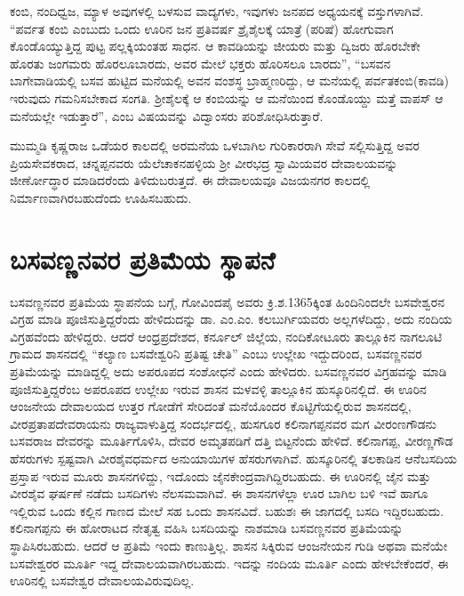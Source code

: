 ಕಂಬಿ, ನಂದಿಧ್ವಜ, ಮ್ಯಾಳ ಅವುಗಳಲ್ಲಿ ಬಳಸುವ ವಾದ್ಯಗಳು, ಇವುಗಳು ಜನಪದ ಅಧ್ಯಯನಕ್ಕೆ ವಸ್ತುಗಳಾಗಿವೆ. “ಪರ್ವತ ಕಂಬಿ ಎಂಬುದು ಒಂದು ಊರಿನ ಜನ ಪ್ರತಿವರ್ಷ ಶ್ರೈಶೈಲಕ್ಕೆ ಯಾತ್ರೆ (ಪರಿಷೆ) ಹೋಗುವಾಗ ಕೊಂಡೊಯ್ಯುತ್ತಿದ್ದ ಪುಟ್ಟ ಪಲ್ಲಕ್ಕಿಯಂತಹ ಸಾಧನ. ಆ ಕಾವಡಿಯನ್ನು ಜೀಯರು ಮತ್ತು ದ್ವಿಜರು ಹೊರಬೇಕೇ ಹೊರತು ಜಂಗಮರು ಹೊರಲೂಬಾರದು, ಅವರ ಮೇಲೆ ಭಕ್ತರು ಹೊರಿಸಲೂ ಬಾರದು”, “ಬಸವನ ಬಾಗೇವಾಡಿಯಲ್ಲಿ ಬಸವ ಹುಟ್ಟಿದ ಮನೆಯಲ್ಲಿ ಅವನ ವಂಶಸ್ಥ ಬ್ರಾಹ್ಮಣರಿದ್ದು, ಆ ಮನೆಯಲ್ಲಿ ಪರ್ವತಕಂಬಿ(ಕಾವಡಿ) ಇರುವುದು ಗಮನಿಸಬೇಕಾದ ಸಂಗತಿ. ಶ‍್ರೀಶೈಲಕ್ಕೆ ಆ ಕಂಬಿಯನ್ನು ಆ ಮನೆಯಿಂದ ಕೊಂಡೊಯ್ದು ಮತ್ತೆ ವಾಪಸ್​ ಆ ಮನೆಯಲ್ಲೇ ಇಡುತ್ತಾರೆ”, ಎಂಬ ವಿಷಯವನ್ನು ವಿದ್ವಾಂಸರು ಪರಿಶೋಧಿಸಿರುತ್ತಾರೆ.

ಮುಮ್ಮಡಿ ಕೃಷ್ಣರಾಜ ಒಡೆಯರ ಕಾಲದಲ್ಲಿ ಅರಮನೆಯ ಒಳಬಾಗಿಲ ಗುರಿಕಾರರಾಗಿ ಸೇವೆ ಸಲ್ಲಿಸುತ್ತಿದ್ದ ಅವರ ಪ್ರಿಯಸೇವಕರಾದ, ಚನ್ನಪ್ಪನವರು ಯೆಲೆಚಾಕನಹಳ್ಳಿಯ ಶ‍್ರೀ ವೀರಭದ್ರ ಸ್ವಾಮಿಯವರ ದೇವಾಲಯವನ್ನು ಜೀರ್ಣೋದ್ಧಾರ ಮಾಡಿದರೆಂದು ತಿಳಿದುಬರುತ್ತದೆ. ಈ ದೇವಾಲಯವೂ ವಿಜಯನಗರ ಕಾಲದಲ್ಲಿ ನಿರ್ಮಾಣವಾಗಿರಬಹುದೆಂದು ಊಹಿಸ\-ಬಹುದು.


\section*{ಬಸವಣ್ಣನವರ ಪ್ರತಿಮೆಯ ಸ್ಥಾಪನೆ}

ಬಸವಣ್ಣನವರ ಪ್ರತಿಮೆಯ ಸ್ಥಾಪನೆಯ ಬಗ್ಗೆ, ಗೋವಿಂದಪೈ ಅವರು ಕ್ರಿ.ಶ.1365ಕ್ಕಿಂತ ಹಿಂದಿನಿಂದಲೇ ಬಸವೇಶ್ವರನ ವಿಗ್ರಹ ಮಾಡಿ ಪೂಜಿಸುತ್ತಿದ್ದರೆಂದು ಹೇಳಿದುದನ್ನು ಡಾ. ಎಂ.ಎಂ. ಕಲಬುರ್ಗಿಯವರು ಅಲ್ಲಗಳೆದಿದ್ದು, ಅದು ನಂದಿಯ ವಿಗ್ರಹವೆಂದು ಹೇಳಿದ್ದರು. ಆದರೆ ಆಂಧ್ರಪ್ರದೇಶದ, ಕರ್ನೂಲ್​ ಜಿಲ್ಲೆಯ, ನಂದಿಕೋಟೂರು ತಾಲ್ಲೂಕಿನ ನಾಗಲೂಟಿ ಗ್ರಾಮದ ಶಾಸನದಲ್ಲಿ “ಕಲ್ಯಾಣ ಬಸವೇಶ್ವರಿನಿ ಪ್ರತಿಷ್ಟ ಚೇತಿ” ಎಂಬು ಉಲ್ಲೇಖ ಇದ್ದುದರಿಂದ, ಬಸವಣ್ಣನವರ ಪ್ರತಿಮೆಯನ್ನು ಮಾಡಿದ್ದಲ್ಲಿ ಅದು ಅಪರೂಪದ ಸಂಶೋಧನೆ ಎಂದು ಹೇಳಿದರು. ಬಸವಣ್ಣನವರ ವಿಗ್ರಹವನ್ನು ಮಾಡಿ ಪೂಜಿಸುತ್ತಿದ್ದರೆಂಬ ಅಪರೂಪದ ಉಲ್ಲೇಖ ಇರುವ ಶಾಸನ ಮಳವಳ್ಳಿ ತಾಲ್ಲೂಕಿನ ಹುಸ್ಕೂರಿನಲ್ಲಿದೆ. ಈ ಊರಿನ ಆಂಜನೇಯ ದೇವಾಲಯದ ಉತ್ತರ ಗೋಡೆಗೆ ಸೇರಿದಂತೆ ಮನೆಯೊಂದರ ಕೊಟ್ಟಿಗೆಯಲ್ಲಿರುವ ಶಾಸನದಲ್ಲಿ, ವೀರಪ್ರತಾಪದೇವರಾಯನು ರಾಜ್ಯವಾಳುತ್ತಿದ್ದ ಸಂದರ್ಭದಲ್ಲಿ, ಹುಸಗೂರ ಕಲಿನಾಗಪ್ಪನವರ ಮಗ ವೀರಂಣಗೌಡನು ಬಸವರಾಜ ದೇವರನ್ನು ಮೂರ್ತಿಗೊಳಿಸಿ, ದೇವರ ಅಮೃತಪಡಿಗೆ ದತ್ತಿ ಬಿಟ್ಟನೆಂದು ಹೇಳಿದೆ. ಕಲಿನಾಗಪ್ಪ, ವೀರಣ್ಣಗೌಡ ಹೆಸರುಗಳು ಸ್ಪಷ್ಟವಾಗಿ ವೀರಶೈವಧರ್ಮದ ಅನುಯಾಯಿಗಳ ಹೆಸರುಗಳಾಗಿವೆ. ಹುಸ್ಕೂರಿನಲ್ಲಿ ತಲಕಾಡಿನ ಆನೆಬಸದಿಯ ಪ್ರಸ್ತಾಪ ಇರುವ ಮೂರು ಶಾಸನಗಳಿದ್ದು, ಇದೊಂದು ಜೈನಕೇಂದ್ರವಾಗಿದ್ದಿರಬಹುದು. ಈ ಊರಿನಲ್ಲಿ ಜೈನ ಮತ್ತು ವೀರಶೈವ ಘರ್ಷಣೆ ನಡೆದು ಬಸದಿಗಳು ನೆಲಸಮವಾಗಿವೆ. ಈ ಶಾಸನಗಳೆಲ್ಲಾ ಊರ ಬಾಗಿಲ ಬಳಿ ಇವೆ ಹಾಗೂ ಇಲ್ಲಿರುವ ಒಂದು ಕಲ್ಲಿನ ಗಾಣದ ಮೇಲೆ ಸಹ ಒಂದು ಶಾಸನವಿದೆ. ಬಹುಶಃ ಈ ಜಾಗದಲ್ಲಿ ಬಸದಿ ಇದ್ದಿರಬಹುದು. ಕಲಿನಾಗಪ್ಪನು ಈ ಹೋರಾಟದ ನೇತೃತ್ವ ವಹಿಸಿ ಬಸದಿಯನ್ನು ನಾಶಮಾಡಿ ಬಸವಣ್ಣನವರ ಪ್ರತಿಮೆಯನ್ನು ಸ್ಥಾಪಿಸಿರಬಹುದು. ಆದರೆ ಆ ಪ್ರತಿಮೆ ಇಂದು ಕಾಣುತ್ತಿಲ್ಲ. ಶಾಸನ ಸಿಕ್ಕಿರುವ ಆಂಜನೇಯನ ಗುಡಿ ಅಥವಾ ಮನೆಯೇ ಬಸವೇಶ್ವರರ ಮೂರ್ತಿ ಇದ್ದ ದೇವಾಲಯವಾಗಿರಬಹುದು. ಇದನ್ನು ನಂದಿಯ ಮೂರ್ತಿ ಎಂದು ಹೇಳಬೇಕೆಂದರೆ, ಈ ಊರಿನಲ್ಲಿ ಬಸವೇಶ್ವರ ದೇವಾಲಯವಿರುವುದಿಲ್ಲ.

